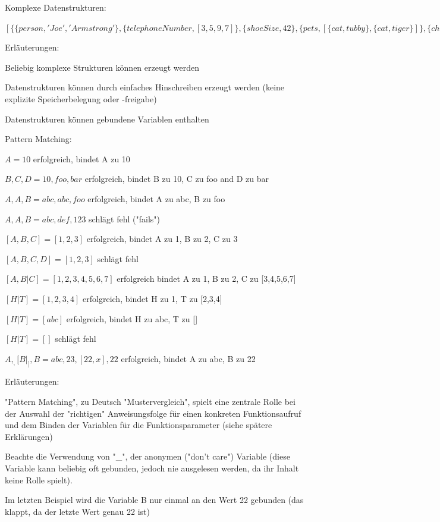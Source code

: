 \documentclass[10pt]{article}
\begin{document}
Komplexe Datenstrukturen:
\begin{itemize*}
  \item $[\{\{person,'Joe', 'Armstrong'\}, \{telephoneNumber, [3,5,9,7]\}, \{shoeSize, 42\}, \{pets, [\{cat, tubby\},\{cat, tiger\}]\}, \{children,[\{thomas, 5\},\{claire,1\}]\}\}, \{\{person,'Mike','Williams'\}, \{shoeSize,41\}, \{likes,[boats, beer]\}, ... \}]$
  \item Erläuterungen:
  \begin{itemize*}
    \item Beliebig komplexe Strukturen können erzeugt werden
    \item Datenstrukturen können durch einfaches Hinschreiben erzeugt werden (keine explizite Speicherbelegung oder -freigabe)
    \item Datenstrukturen können gebundene Variablen enthalten
  \end{itemize*}
\end{itemize*}

Pattern Matching:
\begin{itemize*}
  \item $A = 10$ erfolgreich, bindet A zu 10
  \item ${B, C, D} = {10, foo, bar}$ erfolgreich, bindet B zu 10, C zu foo and D zu bar
  \item ${A, A, B} = {abc, abc, foo}$ erfolgreich, bindet A zu abc, B zu foo
  \item ${A, A, B} = {abc, def, 123}$ schlägt fehl ("fails")
  \item $[A,B,C] = [1,2,3]$ erfolgreich, bindet A zu 1, B zu 2, C zu 3
  \item $[A,B,C,D] = [1,2,3]$ schlägt fehl
  \item $[A,B|C] = [1,2,3,4,5,6,7]$ erfolgreich bindet A zu 1, B zu 2, C zu [3,4,5,6,7]
  \item $[H|T] = [1,2,3,4]$ erfolgreich, bindet H zu 1, T zu [2,3,4]
  \item $[H|T] = [abc]$ erfolgreich, bindet H zu abc, T zu []
  \item $[H|T] = []$ schlägt fehl
  \item ${A,_, [B|_],{B}} = {abc,23,[22,x],{22}}$ erfolgreich, bindet A zu abc, B zu 22
  \item Erläuterungen:
  \begin{itemize*}
    \item "Pattern Matching", zu Deutsch "Mustervergleich", spielt eine zentrale Rolle bei der Auswahl der "richtigen" Anweisungsfolge für einen konkreten Funktionsaufruf und dem Binden der Variablen für die Funktionsparameter (siehe spätere Erklärungen)
    \item Beachte die Verwendung von "\_", der anonymen ("don't care") Variable (diese Variable kann beliebig oft gebunden, jedoch nie ausgelesen werden, da ihr Inhalt keine Rolle spielt).
    \item Im letzten Beispiel wird die Variable B nur einmal an den Wert 22 gebunden (das klappt, da der letzte Wert genau {22} ist)
  \end{itemize*}
\end{itemize*}
\end{document}
